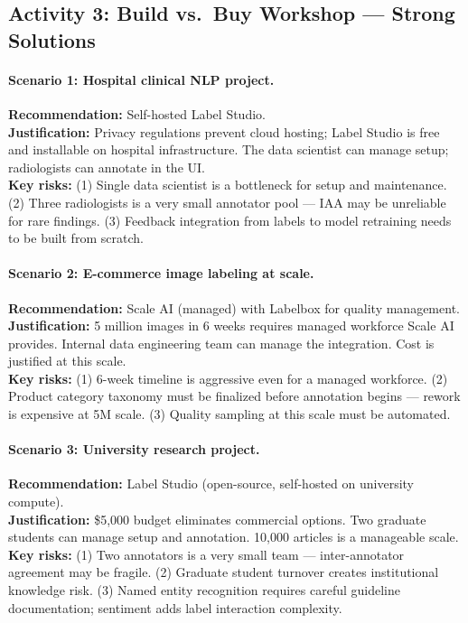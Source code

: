 \subsection{Activity 3: Build vs.\ Buy Workshop --- Strong Solutions}

\paragraph{Scenario 1: Hospital clinical NLP project.}
\textbf{Recommendation:} Self-hosted Label Studio.\\
\textbf{Justification:} Privacy regulations prevent cloud hosting; Label Studio is free and installable on hospital infrastructure. The data scientist can manage setup; radiologists can annotate in the UI.\\
\textbf{Key risks:} (1) Single data scientist is a bottleneck for setup and maintenance. (2) Three radiologists is a very small annotator pool --- IAA may be unreliable for rare findings. (3) Feedback integration from labels to model retraining needs to be built from scratch.

\paragraph{Scenario 2: E-commerce image labeling at scale.}
\textbf{Recommendation:} Scale AI (managed) with Labelbox for quality management.\\
\textbf{Justification:} 5 million images in 6 weeks requires managed workforce Scale AI provides. Internal data engineering team can manage the integration. Cost is justified at this scale.\\
\textbf{Key risks:} (1) 6-week timeline is aggressive even for a managed workforce. (2) Product category taxonomy must be finalized before annotation begins --- rework is expensive at 5M scale. (3) Quality sampling at this scale must be automated.

\paragraph{Scenario 3: University research project.}
\textbf{Recommendation:} Label Studio (open-source, self-hosted on university compute).\\
\textbf{Justification:} \$5,000 budget eliminates commercial options. Two graduate students can manage setup and annotation. 10,000 articles is a manageable scale.\\
\textbf{Key risks:} (1) Two annotators is a very small team --- inter-annotator agreement may be fragile. (2) Graduate student turnover creates institutional knowledge risk. (3) Named entity recognition requires careful guideline documentation; sentiment adds label interaction complexity.

